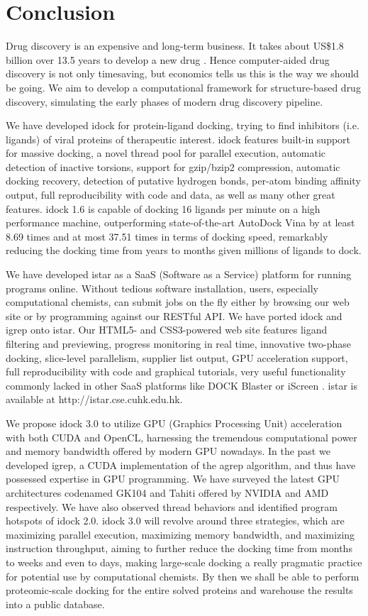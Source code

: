 \chapter{Conclusion}

Drug discovery is an expensive and long-term business. It takes about US\$1.8 billion over 13.5 years to develop a new drug \citep{716}. Hence computer-aided drug discovery is not only timesaving, but economics tells us this is the way we should be going. We aim to develop a computational framework for structure-based drug discovery, simulating the early phases of modern drug discovery pipeline.

We have developed idock for protein-ligand docking, trying to find inhibitors (i.e. ligands) of viral proteins of therapeutic interest. idock features built-in support for massive docking, a novel thread pool for parallel execution, automatic detection of inactive torsions, support for gzip/bzip2 compression, automatic docking recovery, detection of putative hydrogen bonds, per-atom binding affinity output, full reproducibility with code and data, as well as many other great features. idock 1.6 is capable of docking 16 ligands per minute on a high performance machine, outperforming state-of-the-art AutoDock Vina \citep{595} by at least 8.69 times and at most 37.51 times in terms of docking speed, remarkably reducing the docking time from years to months given millions of ligands to dock.

We have developed istar as a SaaS (Software as a Service) platform for running programs online. Without tedious software installation, users, especially computational chemists, can submit jobs on the fly either by browsing our web site or by programming against our RESTful API. We have ported idock and igrep onto istar. Our HTML5- and CSS3-powered web site features ligand filtering and previewing, progress monitoring in real time, innovative two-phase docking, slice-level parallelism, supplier list output, GPU acceleration support, full reproducibility with code and graphical tutorials, very useful functionality commonly lacked in other SaaS platforms like DOCK Blaster \citep{557} or iScreen \citep{899}. istar is available at http://istar.cse.cuhk.edu.hk.

We propose idock 3.0 to utilize GPU (Graphics Processing Unit) acceleration with both CUDA and OpenCL, harnessing the tremendous computational power and memory bandwidth offered by modern GPU nowadays. In the past we developed igrep, a CUDA implementation of the agrep algorithm, and thus have possessed expertise in GPU programming. We have surveyed the latest GPU architectures codenamed GK104 and Tahiti offered by NVIDIA and AMD respectively. We have also observed thread behaviors and identified program hotspots of idock 2.0. idock 3.0 will revolve around three strategies, which are maximizing parallel execution, maximizing memory bandwidth, and maximizing instruction throughput, aiming to further reduce the docking time from months to weeks and even to days, making large-scale docking a really pragmatic practice for potential use by computational chemists. By then we shall be able to perform proteomic-scale docking for the entire solved proteins and warehouse the results into a public database.

